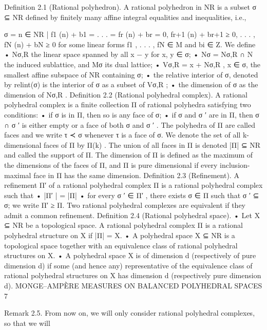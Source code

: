 \documentclass[
  11pt,
]{article}
\newenvironment{Shaded}{}{}
\newcommand{\NormalTok}[1]{#1}
\begin{document}
\begin{Shaded}
\begin{Highlighting}[]
\NormalTok{Definition 2.1 (Rational polyhedron). A rational polyhedron in NR is a subset σ ⊆ NR defined}
\NormalTok{by finitely many affine integral equalities and inequalities, i.e.,}
                           
\NormalTok{                      σ = n ∈ NR | f1 (n) + b1 = . . . = fr (n) + br = 0,}
\NormalTok{                                      fr+1 (n) + br+1 ≥ 0, . . . , fN (n) + bN ≥ 0}
\NormalTok{for some linear forms f1 , . . . , fN ∈ M and bi ∈ Z.}
\NormalTok{    We define}
\NormalTok{      • Nσ,R the linear space spanned by all x − y for x, y ∈ σ;}
\NormalTok{      • Nσ = Nσ,R ∩ N the induced sublattice, and Mσ its dual lattice;}
\NormalTok{      • Vσ,R = x + Nσ,R , x ∈ σ, the smallest affine subspace of NR containing σ;}
\NormalTok{      • the relative interior of σ, denoted by relint(σ) is the interior of σ as a subset of Vσ,R ;}
\NormalTok{      • the dimension of σ as the dimension of Nσ,R .}
\NormalTok{Definition 2.2 (Rational polyhedral complex). A rational polyhedral complex is a finite}
\NormalTok{collection Π of rational polyhedra satisfying two conditions:}
\NormalTok{      • if σ is in Π, then so is any face of σ;}
\NormalTok{      • if σ and σ ′ are in Π, then σ ∩ σ ′ is either empty or a face of both σ and σ ′ .}
\NormalTok{   The polyhedra of Π are called faces and we write τ ≺ σ whenever τ is a face of σ. We denote}
\NormalTok{the set of all k{-}dimensional faces of Π by Π(k) . The union of all faces in Π is denoted |Π| ⊆ NR}
\NormalTok{and called the support of Π.}
\NormalTok{  The dimension of Π is defined as the maximum of the dimensions of the faces of Π, and Π is}
\NormalTok{pure dimensional if every inclusion{-}maximal face in Π has the same dimension.}
\NormalTok{Definition 2.3 (Refinement). A refinement Π′ of a rational polyhedral complex Π is a rational}
\NormalTok{polyhedral complex such that}
\NormalTok{      • |Π′ | = |Π|}
\NormalTok{      • for every σ ′ ∈ Π′ , there exists σ ∈ Π such that σ ′ ⊆ σ;}
\NormalTok{we write Π′ ≥ Π. Two rational polyhedral complexes are equivalent if they admit a common}
\NormalTok{refinement.}
\NormalTok{Definition 2.4 (Rational polyhedral space).}
\NormalTok{      • Let X ⊆ NR be a topological space. A rational polyhedral complex Π is a rational polyhedral}
\NormalTok{        structure on X if |Π| = X.}
\NormalTok{      • A polyhedral space X ⊆ NR is a topological space together with an equivalence class of}
\NormalTok{        rational polyhedral structures on X.}
\NormalTok{      • A polyhedral space X is of dimension d (respectively of pure dimension d) if some (and}
\NormalTok{        hence any) representative of the equivalence class of rational polyhedral structures on X has}
\NormalTok{        dimension d (respectively pure dimension d).}
\NormalTok{                   MONGE–AMPÈRE MEASURES ON BALANCED POLYHEDRAL SPACES                                  7}


\NormalTok{Remark 2.5. From now on, we will only consider rational polyhedral complexes, so that we will}
\end{Highlighting}
\end{Shaded}
\end{document}
